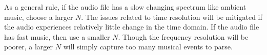 As a general rule, if the audio file has a slow changing spectrum like ambient music, choose a larger $N$.  The issues
related to time resolution will be mitigated if the audio experiences relatively little change in the time domain.  If the 
audio file has fast music, then use a smaller $N$.  Though the frequency resolution will be poorer, a larger $N$ will
simply capture too many musical events to parse.  